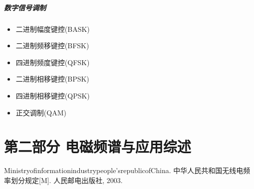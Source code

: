 \documentclass[UTF8]{ctexart}
\begin{document}
\subsubsection{数字信号调制}
\begin{itemize}
\item  二进制幅度键控(BASK)
\item  二进制频移键控(BFSK)
\item  四进制频度键控(QFSK)
\item  二进制相移键控(BPSK)
\item  四进制相移键控(QPSK)
\item  正交调制(QAM)
\end{itemize}
\clearpage
\part{第二部分 电磁频谱与应用综述}

Ministryofinformationindustrypeople'srepublicofChina. 中华人民共和国无线电频率划分规定[M]. 人民邮电出版社, 2003.
\end{document}
